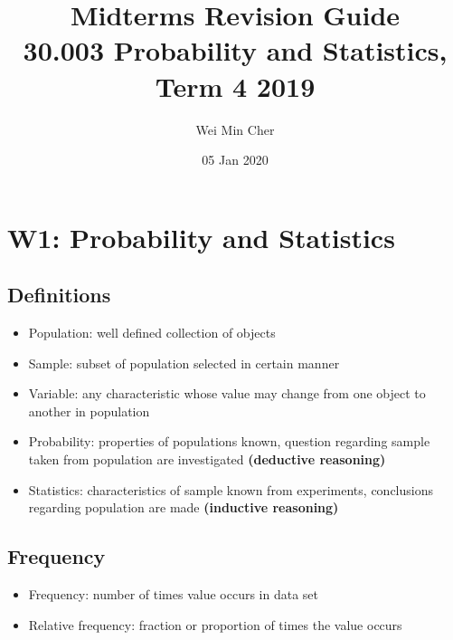 \documentclass[a4paper]{article}
\begin{document}
\title{Midterms Revision Guide\\[0.1cm]
    \large 30.003 Probability and Statistics, Term 4 2019}
\author{Wei Min Cher}
\date{05 Jan 2020}

\maketitle

\tableofcontents

\newpage
\section{W1: Probability and Statistics}
\subsection{Definitions}
\begin{itemize}
    \item Population: well defined collection of objects
    \item Sample: subset of population selected in certain manner
    \item Variable: any characteristic whose value may change from one object to another in population
    \newline
    \item Probability: properties of populations known, question regarding sample taken from population are investigated \textbf{(deductive reasoning)}
    \item Statistics: characteristics of sample known from experiments, conclusions regarding population are made \textbf{(inductive reasoning)}
\end{itemize}
\begin{center}
\end{center}
\subsection{Frequency} 
\begin{itemize}
    \item Frequency: number of times value occurs in data set
    \item Relative frequency: fraction or proportion of times the value occurs
\end{itemize}
\end{document}
